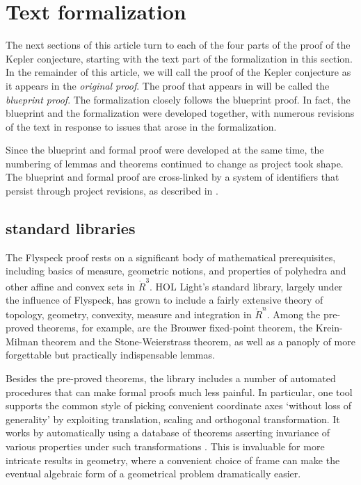 \section{Text formalization}\label{sec:tf}


The next sections of this article turn to each of the four parts of
the proof of the Kepler conjecture, starting with the text part of the
formalization in this section.  In the remainder of this article, we
will call the proof of the Kepler conjecture as it appears in
\cite{Hales:2006:DCG} the {\it original proof}.
The proof that appears in \cite{DSP} will be called the {\it blueprint
  proof}.  The formalization closely follows the blueprint proof.  In
fact, the blueprint and the formalization were developed together, with
numerous revisions of the text in response to issues that arose in the
formalization.

Since the blueprint and formal proof were developed at the same time,
the numbering of lemmas and theorems continued to change as project
took shape.  The blueprint and formal proof are cross-linked by a
system of identifiers that persist through project revisions, as
described in \cite[]{FlyspeckWiki}.

\subsection{standard libraries}

The Flyspeck proof rests on a significant body of mathematical
prerequisites, including basics of measure, geometric notions, and
properties of polyhedra and other affine and convex sets in
$\ring{R}^3$. HOL Light's standard library, largely under the
influence of Flyspeck, has grown to include a fairly extensive theory
of topology, geometry, convexity, measure and integration in
$\ring{R}^n$. Among the pre-proved theorems, for example, are the
Brouwer fixed-point theorem, the Krein-Milman theorem and the
Stone-Weierstrass theorem, as well as a panoply of more forgettable
but practically indispensable lemmas.

Besides the pre-proved theorems, the library includes a number of
automated procedures that can make formal proofs much less painful. In
particular, one tool supports the common style of picking convenient
coordinate axes `without loss of generality' by exploiting
translation, scaling and orthogonal transformation. It works by
automatically using a database of theorems asserting invariance of
various properties under such transformations
\cite{harrison-wlog}. This is invaluable for more intricate results in
geometry, where a convenient choice of frame can make the eventual
algebraic form of a geometrical problem dramatically easier.

